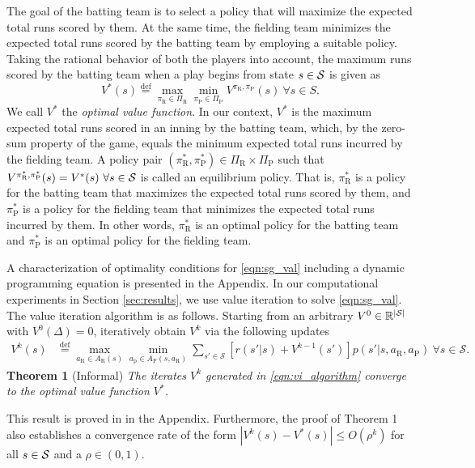 \documentclass[11pt]{article}
\newcommand{\defeq}{\stackrel{\text{def}}{=}}
\newcommand{\abs}[1]{\left\lvert#1\right\rvert}
\begin{document}
    The goal of the batting team is to select a policy that will maximize the expected total runs scored by them. At the same time, the fielding team minimizes the expected total runs scored by the batting team by employing a suitable policy. Taking the rational behavior of both the players into account, the maximum runs scored by the batting team when a play begins from state $s \in {\cal S}$ is given as 
   \begin{equation}
        \label{eqn:sg_val}
        V^*(s) \defeq \max_{\pi_\text{R} \in \Pi_\text{R}}\min_{\pi_\text{P} \in \Pi_\text{P}}V^{\pi_\text{R},\pi_\text{P}}(s) \ \forall s \in S.
   \end{equation}
   We call $V^*$ the \emph{optimal value function}. In our context, $V^*$ is the maximum expected total runs scored in an inning by the batting team, which, by the zero-sum property of the game, equals the minimum expected total runs incurred by the fielding team. A policy pair $(\pi_\text{R}^*,\pi_\text{P}^*) \in \Pi_\text{R} \times \Pi_\text{P}$ such that $V^{\pi_\text{R}^*,\pi_\text{P}^*}(s) = V^*(s) \ \forall s \in {\cal S}$ is called an equilibrium policy. That is, $\pi_\text{R}^*$ is a policy for the batting team that maximizes the expected total runs scored by them, and $\pi_\text{P}^*$ is a policy for the fielding team that minimizes the expected total runs incurred by them. In other words, $\pi_\text{R}^*$ is an optimal policy for the batting team and $\pi_\text{P}^*$ is an optimal policy for the fielding team. 

   A characterization of optimality conditions for \eqref{eqn:sg_val} including a dynamic programming equation is presented in the Appendix. In our computational experiments in Section \ref{sec:results}, we use value iteration to solve \eqref{eqn:sg_val}. The value iteration algorithm is as follows. Starting from an arbitrary $V^0 \in \mathbb{R}^{\abs{\cal S}}$ with $V^0(\Delta) = 0$, iteratively obtain $V^k$ via the following updates
        \begin{align}
          \label{eqn:vi_algorithm}
          V^k(s) &\defeq \max_{a_\text{R} \in A_\text{R}(s)} \min_{a_\text{p} \in A_\text{P}(s,a_\text{R})}\sum_{s' \in \mathcal{S}}[r(s'|s) + V^{k-1}(s')] p(s'|s,a_\text{R},a_\text{P}) \  \forall s \in \mathcal{S}.
        \end{align}
     {\bf Theorem 1} (Informal) {\it 
     The iterates $V^k$ generated in \eqref{eqn:vi_algorithm} converge to the optimal value function $V^*$.}
     
     \noindent This result is proved in  in the Appendix. Furthermore, the proof of Theorem 1 also establishes a convergence rate of the form $\abs{V^k(s) - V^*(s)} \leq O(\rho^k)$ for all $s \in {\cal S}$ and a $\rho \in (0,1)$.
    
\end{document}
